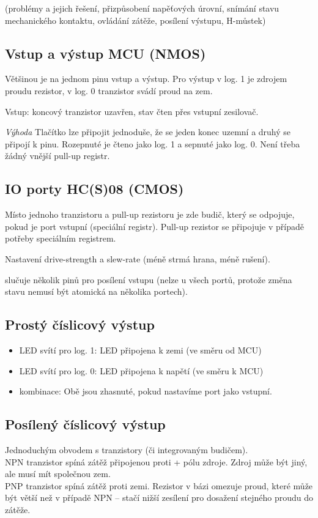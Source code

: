 \documentclass[a4paper, 11pt]{report}
\begin{document}
(problémy a jejich řešení, přizpůsobení napěťových úrovní, snímání stavu mechanického kontaktu, ovládání zátěže, posílení výstupu, H-můstek)

\subsection{Vstup a výstup MCU (NMOS)}
Většinou je na jednom pinu vstup a výstup. Pro výstup v log. 1 je zdrojem proudu rezistor, v log. 0 tranzistor svádí proud na zem.

Vstup: koncový tranzistor uzavřen, stav čten přes vstupní zesilovač.

\emph{Výhoda} Tlačítko lze připojit jednoduše, že se jeden konec uzemní a druhý se připojí k pinu. Rozepnuté je čteno jako log. 1 a sepnuté jako log. 0. Není třeba žádný vnější pull-up registr.

\subsection{IO porty HC(S)08 (CMOS)}
Místo jednoho tranzistoru a pull-up rezistoru je zde budič, který se odpojuje, pokud je port vstupní (speciální registr). Pull-up rezistor se připojuje v případě potřeby speciálním registrem.

Nastavení drive-strength a slew-rate (méně strmá hrana, méně rušení).

 slučuje několik pinů pro posílení vstupu (nelze u všech portů, protože změna stavu nemusí být atomická na několika portech).

\subsection{Prostý číslicový výstup}
\begin{itemize}
	\item LED svítí pro log. 1: LED připojena k zemi (ve směru od MCU)
	\item LED svítí pro log. 0: LED připojena k napětí (ve směru k MCU)
	\item kombinace: Obě jsou zhasnuté, pokud nastavíme port jako vstupní.
\end{itemize}

\subsection{Posílený číslicový výstup}
Jednoduchým obvodem s tranzistory (či integrovaným budičem).\\
NPN tranzistor spíná zátěž připojenou proti + pólu zdroje. Zdroj může být jiný, ale musí mít společnou zem.\\
PNP tranzistor spíná zátěž proti zemi. Rezistor v bázi omezuje proud, které může být větší než v případě NPN -- stačí nižší zesílení pro dosažení stejného proudu do zátěže.
\end{document}
